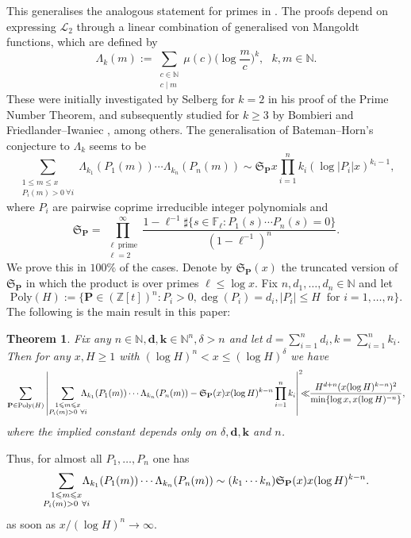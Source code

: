\documentclass[reqno, 11pt]{amsart}
\numberwithin{equation}{section}
\newtheorem{theorem}{Theorem}[section]
\theoremstyle{definition}
\newcommand{\0}{\mathbf{0}}
\renewcommand{\leq}{\leqslant}
\renewcommand{\geq}{\geqslant}
\renewcommand{\b}{\mathbf{b}}
\renewcommand{\P}{\mathbb{P}}
\newcommand{\Z}{\mathbb{Z}}
\renewcommand{\b}{\mathbf}
\renewcommand{\leq}{\leqslant}
\renewcommand{\geq}{\geqslant}
\renewcommand{\#}{\sharp}
\begin{document}
This generalises the analogous statement 
for primes in \cite[Theorem 1.9]
{MR4542704}. The proofs depend on expressing $\mathcal L_2$ through a linear combination of 
  generalised von Mangoldt functions, which are defined by   
$$\Lambda_k(m):= 
\sum_{\substack{ c\in \mathbb N \\ c\mid m }} \mu(c) \Big(\log \frac{m}{c} \Big)^k, \ \ \ k,m \in \mathbb N.$$ 
These were initially investigated by Selberg for $k=2$ in his proof of the Prime Number Theorem, and subsequently studied for
$k \geq 3$ by Bombieri \cite{MR491570, MR396435} and Friedlander–Iwaniec \cite{MR519891,MR1399351}, among others. 
The generalisation of 
Bateman--Horn's conjecture to $\Lambda_k$
seems to be 
$$  
\sum_{\substack{1\leq m\leq x\\P_i(m)>0 \ \forall i} } \Lambda_{k_1}(P_1(m))\cdots \Lambda_{k_n}(P_n(m)) \sim 
\mathfrak S_{\b P} x 
\prod_{i=1}^n  k_i 
(\log |P_i|x)^{k_i-1}  
,$$  where $P_i$ are pairwise coprime
irreducible integer polynomials and 
$$ \mathfrak S_{\b P} =
\prod_{\substack{ \ell \ \mathrm{ prime}\\ \ell=2 }}^\infty 
\frac{1-\ell^{-1} \#\{s\in \mathbb F_\ell:P_1(s)\cdots P_n(s)=0\}}
{(1-\ell^{-1})^n}.$$
 We prove this in $100\%$ of the cases. Denote by $ \mathfrak S_{\b P}(x)$ the truncated version of $ \mathfrak S_{\b P}$ in which the product is over primes $\ell \leq \log x $.
Fix $n,d_1,\ldots, d_n \in \mathbb N$ and let  $$ \textrm{Poly}(H):=\{\b P\in (\Z[t])^n: 
P_i>0,\deg(P_i)=d_i, |P_i|\leq H
\ \textrm{ for } i=1,\ldots, n\}.$$ 
\newline
The following is the main 
result in this paper:
\begin{theorem}  \label{thm:Lambda_k}   Fix any $n\in \mathbb N, \b d, \b k \in \mathbb N^n,\delta>n$ and let 
$d=\sum_{i=1}^n d_i, k=\sum_{i=1}^n k_i$.  Then for any $x,H\geq 1$ with  $ (\log H)^n<x \leq (\log H)^\delta$ we have 
$$ \sum_{  \mathbf P\in  \mathrm{Poly}(H)}  \left| \sum_{\substack{1\leq m\leq x\\P_i(m)>0 \ \forall i} } 
\hspace{-0.3cm}\Lambda_{k_1}(P_1(m))\cdots \Lambda_{k_n}(P_n(m))  - \mathfrak S_{\b P}(x) x (\log H)^{k-n}
\prod_{i=1}^n  k_i  \right|^2  \! \!  \!  \ll  \! \!   \frac{H^{d+n} (x (\log H)^{k-n})^2}
 {\min\{ \log x,x(\log H)^{-n}\}},$$ where the implied constant depends only on $\delta,\b d,\b k$ and $n$.    \end{theorem} 
Thus, for almost all $P_1,\ldots, P_n$ one has $$ \sum_{\substack{1\leq m\leq x\\P_i(m)>0 \ \forall i} } 
\hspace{-0.3cm}\Lambda_{k_1}(P_1(m))\cdots \Lambda_{k_n}(P_n(m))  \sim (k_1\cdots k_n)  \mathfrak S_{\b P}(x) x (\log H)^{k-n}.$$
as soon as $x/(\log H)^n\to \infty$.
\end{document}
